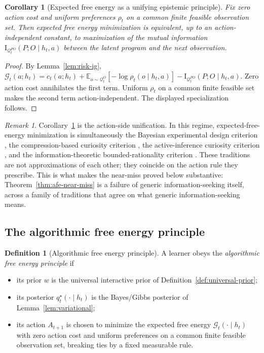 \documentclass[11pt]{article}
\newtheorem{corollary}[theorem]{Corollary}
\theoremstyle{definition}
\newtheorem{definition}[theorem]{Definition}
\theoremstyle{remark}
\newtheorem{remark}[theorem]{Remark}
\newcommand{\Gcal}{\mathcal{G}}
\newcommand{\Qcal}{\mathcal{Q}}
\newcommand{\E}{\mathbb{E}}
\newcommand{\I}{\mathrm{I}}
\begin{document}
\begin{corollary}[Expected free energy as a unifying epistemic principle]
\label{cor:efe-specialization}
Fix zero action cost and uniform preferences $\rho_t$ on a common finite feasible observation set. Then expected free energy minimization is equivalent, up to an action-independent constant, to maximization of the mutual information $\I_{\Qcal_t^{PO}}(P;O\mid h_t,a)$ between the latent program and the next observation.
\end{corollary}

\begin{proof}
By Lemma~\ref{lem:risk-ig}, $\Gcal_t(a;h_t)=c_t(a;h_t)+\E_{o\sim\Qcal_t^O}[-\log\rho_t(o\mid h_t,a)]-\I_{\Qcal_t^{PO}}(P;O\mid h_t,a)$. Zero action cost annihilates the first term. Uniform $\rho_t$ on a common finite feasible set makes the second term action-independent. The displayed specialization follows.
\end{proof}

\begin{remark}
\label{rem:efe-unification}
Corollary~\ref{cor:efe-specialization} is the action-side unification. In this regime, expected-free-energy minimization is simultaneously the Bayesian experimental design criterion \citep{Lindley1956,ChalonerVerdinelli1995,MacKay1992}, the compression-based curiosity criterion \citep{Schmidhuber1991,Schmidhuber2010}, the active-inference curiosity criterion \citep{FristonEtAl2017Curiosity}, and the information-theoretic bounded-rationality criterion \citep{OrtegaBraun2011,OrtegaBraun2013}. These traditions are not approximations of each other; they coincide on the action rule they prescribe. This is what makes the near-miss proved below substantive: Theorem~\ref{thm:afe-near-miss} is a failure of generic information-seeking itself, across a family of traditions that agree on what generic information-seeking means.
\end{remark}

\subsection{The algorithmic free energy principle}

\begin{definition}[Algorithmic free energy principle]
\label{def:afe-principle}
A learner obeys the \emph{algorithmic free energy principle} if
\begin{itemize}
\item[(i)] its prior $w$ is the universal interactive prior of Definition~\ref{def:universal-prior};
\item[(ii)] its posterior $q_t^\star(\cdot\mid h_t)$ is the Bayes/Gibbs posterior of Lemma~\ref{lem:variational};
\item[(iii)] its action $A_{t+1}$ is chosen to minimize the expected free energy $\Gcal_t(\cdot\mid h_t)$ with zero action cost and uniform preferences on a common finite feasible observation set, breaking ties by a fixed measurable rule.
\end{itemize}
\end{definition}
\end{document}
